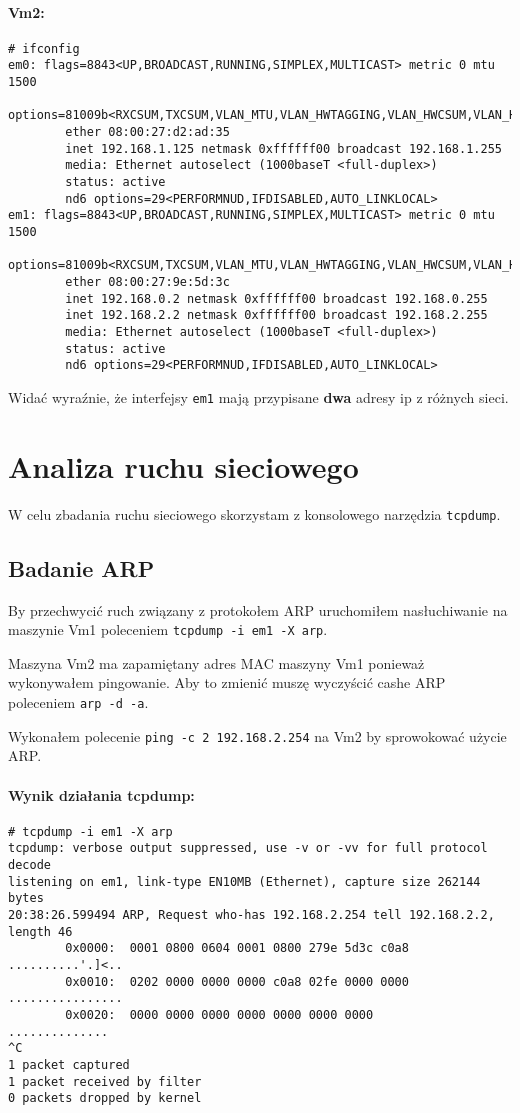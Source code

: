 \documentclass{mwart} %
\begin{document}
\paragraph{Vm2:}
\begin{verbatim}
# ifconfig
em0: flags=8843<UP,BROADCAST,RUNNING,SIMPLEX,MULTICAST> metric 0 mtu 1500
        options=81009b<RXCSUM,TXCSUM,VLAN_MTU,VLAN_HWTAGGING,VLAN_HWCSUM,VLAN_HWFILTER>
        ether 08:00:27:d2:ad:35
        inet 192.168.1.125 netmask 0xffffff00 broadcast 192.168.1.255
        media: Ethernet autoselect (1000baseT <full-duplex>)
        status: active
        nd6 options=29<PERFORMNUD,IFDISABLED,AUTO_LINKLOCAL>
em1: flags=8843<UP,BROADCAST,RUNNING,SIMPLEX,MULTICAST> metric 0 mtu 1500
        options=81009b<RXCSUM,TXCSUM,VLAN_MTU,VLAN_HWTAGGING,VLAN_HWCSUM,VLAN_HWFILTER>
        ether 08:00:27:9e:5d:3c
        inet 192.168.0.2 netmask 0xffffff00 broadcast 192.168.0.255
        inet 192.168.2.2 netmask 0xffffff00 broadcast 192.168.2.255
        media: Ethernet autoselect (1000baseT <full-duplex>)
        status: active
        nd6 options=29<PERFORMNUD,IFDISABLED,AUTO_LINKLOCAL>
\end{verbatim}

Widać wyraźnie, że interfejsy \texttt{em1} mają przypisane \textbf{dwa} adresy ip z różnych sieci.

\section{Analiza ruchu sieciowego}
W celu zbadania ruchu sieciowego skorzystam z konsolowego narzędzia \texttt{tcpdump}.

\subsection{Badanie ARP}
By przechwycić ruch związany z protokołem ARP uruchomiłem nasłuchiwanie na maszynie Vm1 poleceniem \texttt{tcpdump -i em1 -X arp}.

Maszyna Vm2 ma zapamiętany adres MAC maszyny Vm1 ponieważ wykonywałem pingowanie. Aby to zmienić muszę wyczyścić cashe ARP poleceniem \texttt{arp -d -a}.

Wykonałem polecenie \texttt{ping -c 2 192.168.2.254} na Vm2 by sprowokować użycie ARP.

\paragraph{Wynik działania tcpdump:}
\begin{verbatim}
# tcpdump -i em1 -X arp
tcpdump: verbose output suppressed, use -v or -vv for full protocol decode
listening on em1, link-type EN10MB (Ethernet), capture size 262144 bytes
20:38:26.599494 ARP, Request who-has 192.168.2.254 tell 192.168.2.2, length 46
        0x0000:  0001 0800 0604 0001 0800 279e 5d3c c0a8  ..........'.]<..
        0x0010:  0202 0000 0000 0000 c0a8 02fe 0000 0000  ................
        0x0020:  0000 0000 0000 0000 0000 0000 0000       ..............
^C
1 packet captured
1 packet received by filter
0 packets dropped by kernel
\end{verbatim}
\end{document}
